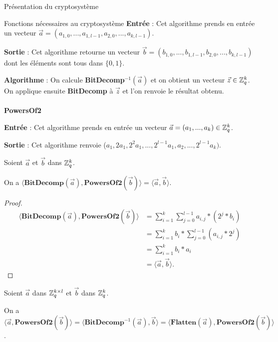 \begin{section}{Présentation du cryptosystème}
\begin{subsection}{Fonctions nécessaires au cryptosystème}
	\textbf{Entrée} : Cet algorithme prends en entrée un vecteur $\vec{a} = (a_{1,0}, ..., a_{1,l-1}, a_{2,0}, ..., a_{k,l-1})$.

	\textbf{Sortie} : Cet algorithme retourne un vecteur $\vec{b} = (b_{1,0}, ..., b_{1,l-1}, b_{2,0}, ..., b_{k,l-1})$ dont les éléments sont tous dans $\{ 0,1\} $.

	\textbf{Algorithme} : On calcule \textbf{BitDecomp}$^{-1}(\vec{a})$ et on obtient un vecteur $\vec{z} \in \mathbb{Z}_q^{k}$. On applique ensuite \textbf{BitDecomp} à $\vec{z}$ et l'on renvoie le résultat obtenu.
	
	\paragraph{}
	\textbf{PowersOf2}
	\flushleft

	\textbf{Entrée} : Cet algorithme prends en entrée un vecteur $\vec{a} = (a_1, ..., a_k) \in \mathbb{Z}_q^{k}$.

	\textbf{Sortie} : Cet algorithme renvoie ($a_1, 2 a_1, 2^{2} a_1, ..., 2^{l-1} a_1, a_2, ..., 2^{l-1} a_k)$.
	
	\begin{prop}
	Soient $\vec{a}$ et $\vec{b}$ dans $\mathbb{Z}_q^{k}$.

	On a $\langle \textbf{BitDecomp}(\vec{a}), \textbf{PowersOf2}(\vec{b}) \rangle = \langle\vec{a},\vec{b} \rangle$.
	\end{prop}

	\begin{proof}
	\begin{align*}
	\langle \textbf{BitDecomp}(\vec{a}), \textbf{PowersOf2}(\vec{b}) \rangle &= \sum\limits_{i=1}^{k} \sum\limits_{j=0}^{l-1} a_{i,j} * (2^{j} * b_i) \\
	&= \sum\limits_{i=1}^{k} b_i * \sum\limits_{j=0}^{l-1} (a_{i,j} * 2^{j}) \\
	&= \sum\limits_{i=1}^{k} b_i * a_i \\
	&= \langle\vec{a},\vec{b} \rangle.
	\end{align*}
	\end{proof}
	
	\begin{prop}
	Soient $\vec{a}$ dans $\mathbb{Z}_q^{k \times l}$ et $\vec{b}$ dans $\mathbb{Z}_q^{k}$.

	On a $\langle \vec{a}, \textbf{PowersOf2}(\vec{b}) \rangle = \langle \textbf{BitDecomp}^{-1}(\vec{a}), \vec{b}\rangle = \langle \textbf{Flatten}(\vec{a}),\textbf{PowersOf2}(\vec{b}) \rangle$.
	\end{prop}


\end{subsection}
\end{section}
